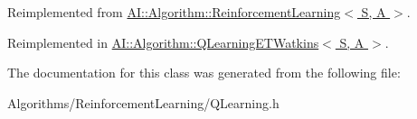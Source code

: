 Reimplemented from \hyperlink{classAI_1_1Algorithm_1_1ReinforcementLearning_a25d7fa245a79e61061436dc0f1db90cb}{A\-I\-::\-Algorithm\-::\-Reinforcement\-Learning$<$ S, A $>$}.



Reimplemented in \hyperlink{classAI_1_1Algorithm_1_1QLearningETWatkins_a5cbad8c16dfbf6fe72c85fe5c8c4e273}{A\-I\-::\-Algorithm\-::\-Q\-Learning\-E\-T\-Watkins$<$ S, A $>$}.



The documentation for this class was generated from the following file\-:\begin{DoxyCompactItemize}
\item 
Algorithms/\-Reinforcement\-Learning/Q\-Learning.\-h\end{DoxyCompactItemize}
